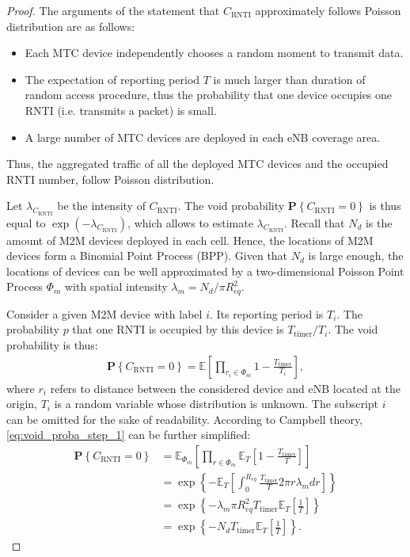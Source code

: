 \begin{proof}
	 The arguments of the statement that $C_{\text{RNTI}}$ approximately follows Poisson distribution are as follows:
	\begin{itemize}[leftmargin=*, noitemsep]
		\item Each MTC device independently chooses a random moment to transmit data. 
		\item The expectation of reporting period $T$ is much larger than duration of random access procedure, thus the probability that one device occupies one RNTI (i.e. transmits a packet) is small.
		\item A large number of MTC devices are deployed in each eNB coverage area.
	\end{itemize}
	Thus, the aggregated traffic of all the deployed MTC devices and the occupied RNTI number, follow Poisson distribution.
	
	Let $\lambda_{C_{\text{RNTI}}}$ be the intensity of $C_{\text{RNTI}}$. The void probability $\mathbf{P} \left\lbrace  C_{\text{RNTI}} = 0  \right\rbrace$ is thus equal to $\exp(-\lambda_{C_{\text{RNTI}}})$, which allows to estimate $\lambda_{C_{\text{RNTI}}}$. Recall that $N_{d}$ is the amount of M2M devices deployed in each cell. Hence, the locations of M2M devices form a Binomial Point Process (BPP). Given that $N_d$ is large enough, the locations of devices can be well approximated by a two-dimensional Poisson Point Process $\Phi_m$ with spatial intensity $\lambda_m = N_d / \pi R_{eq}^2$.

	Consider a given M2M device with label $i$. Its reporting period is $T_i$. The probability $p$ that one RNTI is occupied by this device is $T_{\text{timer}}/T_i$. The void probability is thus:
	\begin{align}
		\label{eq:void_proba_step_1}
		\mathbf{P} \left\lbrace  C_{\text{RNTI}} = 0 \right\rbrace  = \mathbb{E} \left[ \prod_{r_i \in \Phi_m}^{} 1 -  \frac{T_{\text{timer}}}{T_i} \right] ,
	\end{align}
	where $r_i$ refers to distance between the considered device and eNB located at the origin, $T_i$ is a random variable whose distribution is unknown. The subscript $i$ can be omitted for the sake of readability. According to Campbell theory, \eqref{eq:void_proba_step_1} can be further simplified: 
	\begin{align}
		\label{eq:rnti_nb_void_proba}
		\mathbf{P} \left\lbrace  C_{\text{RNTI}} = 0  \right\rbrace  &= \mathbb{E}_{\Phi_m} \left[ \prod_{r \in \Phi_m}^{} \mathbb{E}_{T} \left[ 1 - \frac{T_{\text{timer}}}{T} \right] \right] \nonumber\\
		&= \exp\left\lbrace -\mathbb{E}_{T} \left[ \int_{0}^{R_{eq}} \frac{T_{\text{timer}}}{T} 2\pi r \lambda_m dr  \right] \right\rbrace \nonumber\\
		&= \exp\left\lbrace -\lambda_m \pi R_{eq}^2  T_{\text{timer}} \mathbb{E}_{T} \left[ \frac{1}{T}  \right] \right\rbrace \nonumber \\
		&= \exp\left\lbrace -N_{d} T_{\text{timer}} \mathbb{E}_T \left[ \frac{1}{T} \right]\right\rbrace. 
	\end{align}
	

\end{proof}
